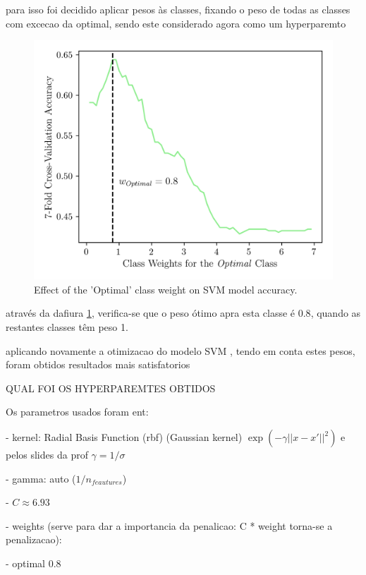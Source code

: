 \documentclass[conference]{IEEEtran}
\begin{document}
para isso foi decidido aplicar pesos às classes, fixando o peso de todas as classes com excecao da optimal, sendo este considerado agora como um hyperparemto

\begin{figure}[H]
    \centering
    \includegraphics[width=1\linewidth]{assets/SVM_OptimalWeight.png}
    \caption{Effect of the 'Optimal' class weight on SVM model accuracy.}
    \label{svm_weight}
\end{figure}

através da dafiura \ref{svm_weight}, verifica-se que o peso ótimo apra esta classe é $0.8$, quando as restantes classes têm peso 1.

aplicando novamente a otimizacao do modelo SVM , tendo em conta estes pesos, foram obtidos resultados mais satisfatorios

QUAL FOI OS HYPERPAREMTES OBTIDOS

Os parametros usados foram ent:


- kernel: Radial Basis Function (rbf) (Gaussian kernel) $\exp(-\gamma ||x - x'||^2)$ e pelos slides da prof $\gamma = 1 / \sigma$ 

- gamma: auto ($1 / n_{feautures}$)

- $C \approx 6.93$

- weights (serve para dar a importancia da penalicao: C * weight torna-se a penalizacao): 

    - optimal 0.8
\end{document}
